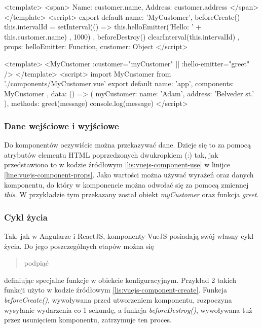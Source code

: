 	\begin{code}[
		language=javascript,
		caption={Utworzenie komponentu z danymi wejściowymi w VueJS (źródło: opracowanie własne)},
		label={lis:vuejs-component-create},
		escapechar=|
	]
<template>
  <span>
    Name: {{customer.name}},
    Address: {{customer.address}}
  </span>
</template>
<script>
  export default {
    name: 'MyCustomer',
    beforeCreate() {
      this.intervalId = setInterval(() => {
        this.helloEmitter('Hello: ' + this.customer.name)
      }, 1000)
    },
    beforeDestroy() {
      clearInterval(this.intervalId)
    },
    props: {
      helloEmitter: Function,
      customer: Object
    }
  }
</script>
	\end{code}
	
	\begin{code}[
		language=javascript,
		caption={Użycie komponentu z danymi wejściowymi w VueJS (źródło: opracowanie własne)},
		label={lis:vuejs-component-use},
		escapechar=|
	]
<template>
  <MyCustomer
    :customer="myCustomer" |\label{line:vuejs-component-props}|
    :hello-emitter="greet"
  />
</template>
<script>
  import MyCustomer from './components/MyCustomer.vue'
  export default {
    name: 'app',
    components: {
      MyCustomer
    },
    data: () => ({
      myCustomer: {
        name: 'Adam',
        address: 'Belveder st.'
      }
    }),
    methods: {
      greet(message) {
        console.log(message)
      }
    }
  }
</script>
	\end{code}
	
	\subsubsection{Dane wejściowe i wyjściowe}
	Do komponentów oczywiście można przekazywać dane. Dzieje się to za pomocą atrybutów elementu HTML poprzedzonych dwukropkiem (:) tak, jak przedstawiono to w kodzie źródłowym \ref{lis:vuejs-component-use} w linijce \ref{line:vuejs-component-props}. Jako wartości można używać wyrażeń oraz danych komponentu, do który w komponencie można odwołać się za pomocą zmiennej \textit{this}. W przykładzie tym przekazany został obiekt \textit{myCustomer} oraz funkcja \textit{greet}.
	\subsubsection{Cykl życia}
	Tak, jak w Angularze i ReactJS, komponenty VueJS posiadają swój własny cykl życia. Do jego poszczególnych etapów można się \blockquote{podpiąć} definiując specjalne funkcje w obiekcie konfiguracyjnym. Przykład 2 takich funkcji użyto w kodzie źródłowym \ref{lis:vuejs-component-create}. Funkcja \textit{beforeCreate()}, wywoływana przed utworzeniem komponentu, rozpoczyna wysyłanie wydarzenia co 1 sekundę, a funkcja \textit{beforeDestroy()}, wywoływana tuż przez usunięciem komponentu, zatrzymuje ten proces.
